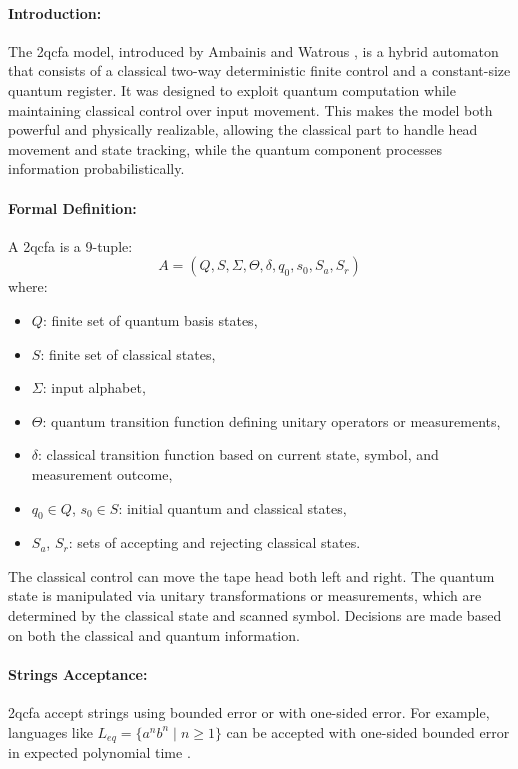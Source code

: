 \paragraph{Introduction:}  
The \gls{2qcfa} model, introduced by Ambainis and Watrous \cite{ambainis2002two}, is a hybrid automaton that consists of a classical two-way deterministic finite control and a constant-size quantum register. It was designed to exploit quantum computation while maintaining classical control over input movement. This makes the model both powerful and physically realizable, allowing the classical part to handle head movement and state tracking, while the quantum component processes information probabilistically.

\paragraph{Formal Definition:}  
A \gls{2qcfa} is a 9-tuple:
\[
A = (Q, S, \Sigma, \Theta, \delta, q_0, s_0, S_a, S_r)
\]
where:
\begin{itemize}
    \item $Q$: finite set of quantum basis states,
    \item $S$: finite set of classical states,
    \item $\Sigma$: input alphabet,
    \item $\Theta$: quantum transition function defining unitary operators or measurements,
    \item $\delta$: classical transition function based on current state, symbol, and measurement outcome,
    \item $q_0 \in Q$, $s_0 \in S$: initial quantum and classical states,
    \item $S_a$, $S_r$: sets of accepting and rejecting classical states.
\end{itemize}
The classical control can move the tape head both left and right. The quantum state is manipulated via unitary transformations or measurements, which are determined by the classical state and scanned symbol. Decisions are made based on both the classical and quantum information.

\paragraph{Strings Acceptance:}  
\gls{2qcfa} accept strings using bounded error or with one-sided error. For example, languages like $L_{eq} = \{ a^n b^n \mid n \geq 1 \}$ can be accepted with one-sided bounded error in expected polynomial time \cite{ambainis2002two}.

